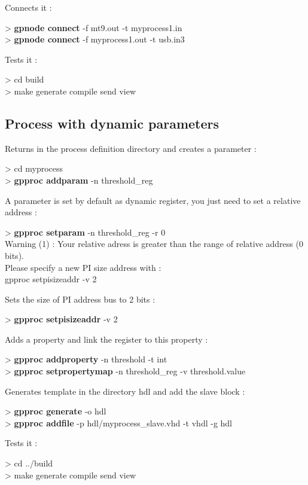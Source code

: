 \documentclass[10pt,a4paper]{article}
\begin{document}
Connects it :
\begin{sample}
> \textbf{gpnode connect} -f mt9.out -t myprocess1.in \\
> \textbf{gpnode connect} -f myprocess1.out -t usb.in3
\end{sample}

Tests it :
\begin{sample}
> cd build \\
> make generate compile send view
\end{sample}


\subsection{Process with dynamic parameters}

Returns in the process definition directory and creates a parameter :
\begin{sample}
> cd myprocess \\
> \textbf{gpproc addparam} -n threshold\_reg
\end{sample}

A parameter is set by default as dynamic register, you just need to set a relative address :
\begin{sample}
> \textbf{gpproc setparam} -n threshold\_reg -r 0 \\
Warning (1) : Your relative adress is greater than the range of relative address (0 bits). \\
Please specify a new PI size address with : \\
gpproc setpisizeaddr -v 2
\end{sample}

Sets the size of PI address bus to 2 bits :
\begin{sample}
> \textbf{gpproc setpisizeaddr} -v 2
\end{sample}

Adds a property and link the register to this property :
\begin{sample}
> \textbf{gpproc addproperty} -n threshold -t int \\
> \textbf{gpproc setpropertymap} -n threshold\_reg -v threshold.value
\end{sample}

Generates template in the directory hdl and add the slave block :
\begin{sample}
> \textbf{gpproc generate} -o hdl \\
> \textbf{gpproc addfile} -p hdl/myprocess\_slave.vhd -t vhdl -g hdl
\end{sample}

Tests it :
\begin{sample}
> cd ../build \\
> make generate compile send view
\end{sample}
\end{document}
